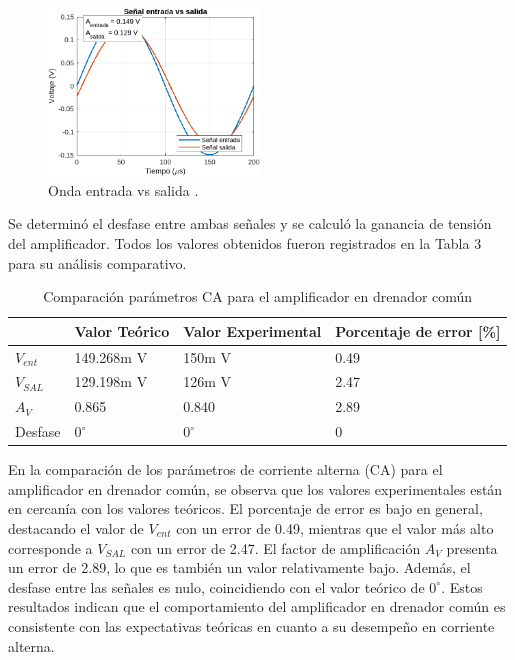 \documentclass[journal]{IEEEtran}
\begin{document}
\begin{figure}[H]
    \centering
    \includegraphics[width=0.5\textwidth]{Media/onda_entrada_salida.png}
    \caption{Onda entrada vs salida .}
    \label{fig:onda_entrada_salida.}
\end{figure}
\par Se determinó el desfase entre ambas señales y se calculó la ganancia de tensión del amplificador. Todos los valores obtenidos fueron registrados en la Tabla 3 para su análisis comparativo.
\begin{table}[h]
    \caption{Comparación parámetros CA para el amplificador en drenador común}
    \centering
    \renewcommand{\arraystretch}{1.2} %
    \begin{tabular}{|l|p{2cm}|p{2cm}|p{2cm}|}
        \hline
        & \textbf{Valor Teórico} & \textbf{Valor Experimental} & \textbf{Porcentaje de error [\%]} \\
        \hline
        \( V_{ent}\) & 149.268m V   & 150m V  & 0.49 \\
        \hline
        \( V_{SAL} \) & 129.198m V    & 126m V  & 2.47 \\
        \hline
        \( A_V \) & 0.865 & 0.840 & 2.89 \\
        \hline
        Desfase & $0^\circ$ & $0^\circ$ & 0 \\
        \hline
    \end{tabular}
    \label{tab:resistencias}
\end{table}
\par En la comparación de los parámetros de corriente alterna (CA) para el amplificador en drenador común, se observa que los valores experimentales están en cercanía con los valores teóricos. El porcentaje de error es bajo en general, destacando el valor de \( V_{ent}\) con un error de 0.49, mientras que el valor más alto corresponde a \( V_{SAL} \) con un error de 2.47. El factor de amplificación \( A_V \) presenta un error de 2.89, lo que es también un valor relativamente bajo. Además, el desfase entre las señales es nulo, coincidiendo con el valor teórico de $0^\circ$. Estos resultados indican que el comportamiento del amplificador en drenador común es consistente con las expectativas teóricas en cuanto a su desempeño en corriente alterna.
\end{document}
